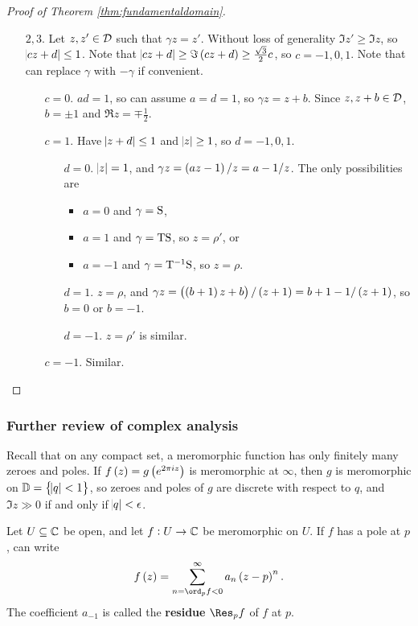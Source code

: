 \begin{proof}[Proof of Theorem \ref{thm:fundamentaldomain}]
\begin{enumerate}
\item[$ 2, 3 $.] Let $ z, z' \in \DDD $ such that $ \gamma z = z' $. Without loss of generality $ \Im z' \ge \Im z $, so $ \abs{cz + d} \le 1 $. Note that $ \abs{cz + d} \ge \Im \br{cz + d} \ge \tfrac{\sqrt{3}}{2}c $, so $ c = -1, 0, 1 $. Note that can replace $ \gamma $ with $ -\gamma $ if convenient.
\begin{itemize}[leftmargin=0.5in]
\item[$ c = 0 $.] $ ad = 1 $, so can assume $ a = d = 1 $, so $ \gamma z = z + b $.
Since $ z, z + b \in \DDD $, $ b = \pm 1 $ and $ \Re z = \mp\tfrac{1}{2} $.
\item[$ c = 1 $.] Have $ \abs{z + d} \le 1 $ and $ \abs{z} \ge 1 $, so $ d = -1, 0, 1 $.
\begin{itemize}[leftmargin=0.5in]
\item[$ d = 0 $.] $ \abs{z} = 1 $, and $ \gamma z = \br{az - 1} / z = a - 1 / z $.
The only possibilities are
\begin{itemize}
\item $ a = 0 $ and $ \gamma = \S $,
\item $ a = 1 $ and $ \gamma = \T\S $, so $ z = \rho' $, or
\item $ a = -1 $ and $ \gamma = \T^{-1}\S $, so $ z = \rho $.
\end{itemize}
\item[$ d = 1 $.] $ z = \rho $, and $ \gamma z = \br{\br{b + 1}z + b} / \br{z + 1} = b + 1 - 1 / \br{z + 1} $, so $ b = 0 $ or $ b = -1 $.
\item[$ d = -1 $.] $ z = \rho' $ is similar.
\end{itemize}
\item[$ c = -1 $.] Similar.
\end{itemize}
\end{enumerate}
\end{proof}

\subsubsection{Further review of complex analysis}

Recall that on any compact set, a meromorphic function has only finitely many zeroes and poles. If $ f\br{z} = g\br{e^{2\pi i z}} $ is meromorphic at $ \infty $, then $ g $ is meromorphic on $ \DD = \cbr{\abs{q} < 1} $, so zeroes and poles of $ g $ are discrete with respect to $ q $, and $ \Im z \gg 0 $ if and only if $ \abs{q} < \epsilon $.

\begin{definition}
Let $ U \subseteq \CC $ be open, and let $ f : U \to \CC $ be meromorphic on $ U $. If $ f $ has a pole at $ p $, can write
$$ f\br{z} = \sum_{n = \ord_p f < 0}^\infty a_n\br{z - p}^n. $$
The coefficient $ a_{-1} $ is called the \textbf{residue} $ \Res_p f $ of $ f $ at $ p $.
\end{definition}

